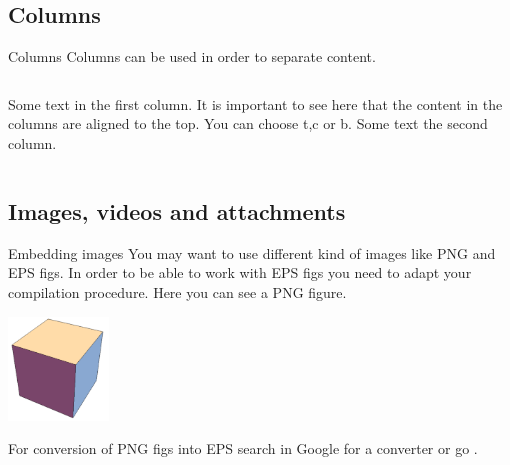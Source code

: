 \documentclass{beamer}
\begin{document}

\subsection{Columns}
\begin{frame}{Columns}
Columns can be used in order to separate content. \\[1cm]
\begin{columns}[t]
	Some text in the first column. It is important to see here that the content in the columns are aligned to the top. You can choose t,c or b.
	Some text the second column.
\end{columns}
\end{frame}


\subsection{Images, videos and attachments}
\begin{frame}{Embedding images}
You may want to use different kind of images like PNG and EPS figs. In order to be able to work with EPS figs you need to adapt your compilation procedure. Here you can see a PNG figure.
\begin{center}
	\includegraphics[width=0.2\textwidth]{figs/cube}
\end{center}
For conversion of PNG figs into EPS search in Google for a converter or go .
\end{frame}
\end{document}
